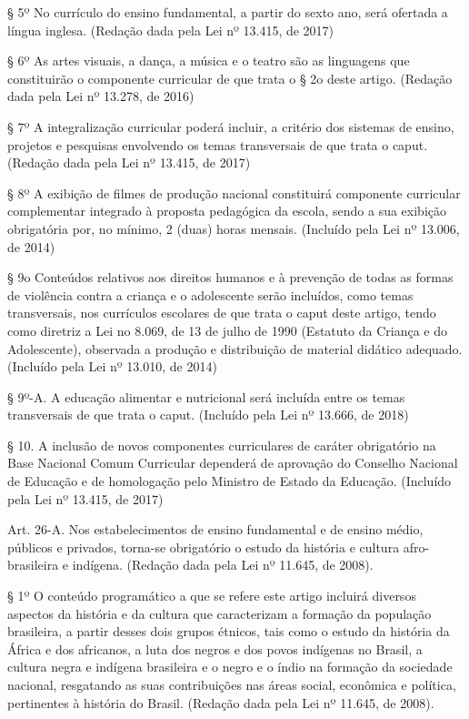 \documentclass[
]{book}
\begin{document}
§ 5º No currículo do ensino fundamental, a partir do sexto ano, será ofertada a língua inglesa. (Redação dada pela Lei nº 13.415, de 2017)

§ 6º As artes visuais, a dança, a música e o teatro são as linguagens que constituirão o componente curricular de que trata o § 2o deste artigo. (Redação dada pela Lei nº 13.278, de 2016)

§ 7º A integralização curricular poderá incluir, a critério dos sistemas de ensino, projetos e pesquisas envolvendo os temas transversais de que trata o caput. (Redação dada pela Lei nº 13.415, de 2017)

§ 8º A exibição de filmes de produção nacional constituirá componente curricular complementar integrado à proposta pedagógica da escola, sendo a sua exibição obrigatória por, no mínimo, 2 (duas) horas mensais. (Incluído pela Lei nº 13.006, de 2014)

§ 9o Conteúdos relativos aos direitos humanos e à prevenção de todas as formas de violência contra a criança e o adolescente serão incluídos, como temas transversais, nos currículos escolares de que trata o caput deste artigo, tendo como diretriz a Lei no 8.069, de 13 de julho de 1990 (Estatuto da Criança e do Adolescente), observada a produção e distribuição de material didático adequado. (Incluído pela Lei nº 13.010, de 2014)

§ 9º-A. A educação alimentar e nutricional será incluída entre os temas transversais de que trata o caput. (Incluído pela Lei nº 13.666, de 2018)

§ 10. A inclusão de novos componentes curriculares de caráter obrigatório na Base Nacional Comum Curricular dependerá de aprovação do Conselho Nacional de Educação e de homologação pelo Ministro de Estado da Educação. (Incluído pela Lei nº 13.415, de 2017)

Art. 26-A. Nos estabelecimentos de ensino fundamental e de ensino médio, públicos e privados, torna-se obrigatório o estudo da história e cultura afro-brasileira e indígena. (Redação dada pela Lei nº 11.645, de 2008).

§ 1º O conteúdo programático a que se refere este artigo incluirá diversos aspectos da história e da cultura que caracterizam a formação da população brasileira, a partir desses dois grupos étnicos, tais como o estudo da história da África e dos africanos, a luta dos negros e dos povos indígenas no Brasil, a cultura negra e indígena brasileira e o negro e o índio na formação da sociedade nacional, resgatando as suas contribuições nas áreas social, econômica e política, pertinentes à história do Brasil. (Redação dada pela Lei nº 11.645, de 2008).
\end{document}
